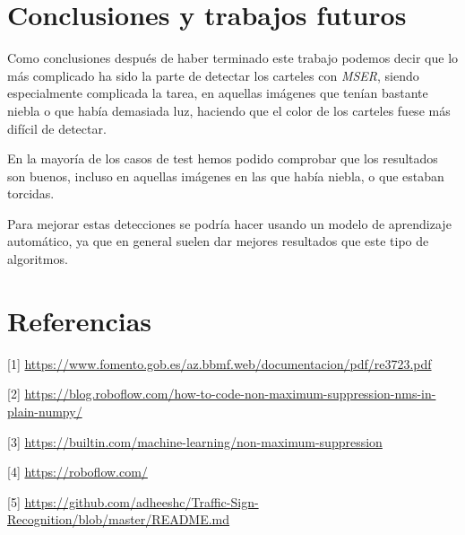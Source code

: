 \documentclass[a4paper, 12pt]{article}
\begin{document}
\section{Conclusiones y trabajos futuros}
Como conclusiones después de haber terminado este trabajo podemos decir que lo más complicado ha sido la parte de detectar los carteles con \textit{MSER}, siendo especialmente complicada la tarea, en aquellas imágenes que tenían bastante niebla o que había demasiada luz, haciendo que el color de los carteles fuese más difícil de detectar. 

En la mayoría de los casos de test hemos podido comprobar que los resultados son buenos, incluso en aquellas imágenes en las que había niebla, o que estaban torcidas.

Para mejorar estas detecciones se podría hacer usando un modelo de aprendizaje automático, ya que en general suelen dar mejores resultados que este tipo de algoritmos. 

\section{Referencias}
[1] \href{https://www.fomento.gob.es/az.bbmf.web/documentacion/pdf/re3723.pdf}{https://www.fomento.gob.es/az.bbmf.web/documentacion/pdf/re3723.pdf}

[2] \href{https://blog.roboflow.com/how-to-code-non-maximum-suppression-nms-in-plain-numpy/}{https://blog.roboflow.com/how-to-code-non-maximum-suppression-nms-in-plain-numpy/}

[3] \href{https://builtin.com/machine-learning/non-maximum-suppression}{https://builtin.com/machine-learning/non-maximum-suppression}

[4] \href{https://roboflow.com/}{https://roboflow.com/}

[5] \href{https://github.com/adheeshc/Traffic-Sign-Recognition/blob/master/README.md}{https://github.com/adheeshc/Traffic-Sign-Recognition/blob/master/README.md}
\end{document}
